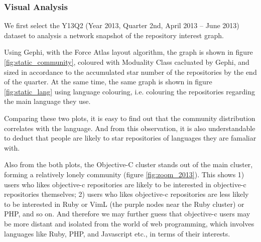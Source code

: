 \documentclass[11pt]{article}
\begin{document}
\subsubsection{Visual Analysis}
We first select the Y13Q2 (Year 2013, Quarter 2nd, April 2013 -- June 2013) dataset to analysis a network snapshot of the repository interest graph.

Using Gephi, with the Force Atlas layout algorithm, the graph is shown in figure \ref{fig:static_community}, coloured with Moduality Class cacluated by Gephi, and sized in accordance to the accumulated star number of the repositories by the end of the quarter. At the same time, the same graph is shown in figure \ref{fig:static_lang} using language colouring, i.e. colouring the repositories regarding the main language they use.

Comparing these two plots, it is easy to find out that the community distribution correlates with the language.
And from this observation, it is also understandable to deduct that people are likely to star repositories of languages they are famaliar with.

Also from the both plots, the Objective-C cluster stands out of the main cluster, forming a relatively lonely community (figure \ref{fig:zoom_2013}). This shows 1) users who likes objective-c repositories are likely to be interested in objective-c repositories themselves; 2) users who likes objective-c repositories are less likely to be interested in Ruby or VimL (the purple nodes near the Ruby cluster) or PHP, and so on.
And therefore we may further guess that objective-c users may be more distant and isolated from the world of web programming, which involves languages like Ruby, PHP, and Javascript etc., in terms of their interests.
\end{document}
